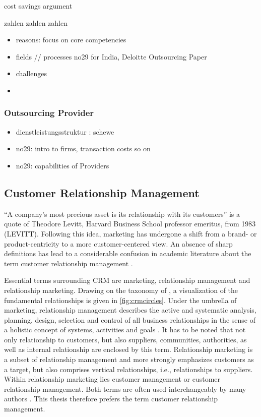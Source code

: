 		cost savings argument
		
		zahlen zahlen zahlen
		
		
		\begin{itemize}
			\item reasons: focus on core competencies
			\item fields // processes no29 for India, Deloitte Outsourcing Paper
			\item challenges
			\item 
		\end{itemize}
		\subsubsection{Outsourcing Provider}
		
		\begin{itemize}
			\item dienstleistungsstruktur  : schewe
			\item no29: intro to firms, transaction costs so on
			\item no29: capabilities of Providers
		\end{itemize}
		\subsection{Customer Relationship Management}
		\enquote{A company's most precious asset is its relationship with its customers} is a quote of Theodore Levitt, Harvard Business School professor emeritus, from 1983 (LEVITT). Following this idea, marketing has undergone a shift from a brand- or product-centricity to a more customer-centered view. An absence of sharp definitions has lead to a considerable confusion in academic literature about the term customer relationship management  \cite{paynefrow2005}. 
		
		Essential terms surrounding CRM are marketing, relationship management and relationship marketing. Drawing on the taxonomy of \cite{hippnerwilde2011}, a visualization of the fundamental relationships is given in \Fig \ref{fig:crmcircles}. Under the umbrella of marketing, relationship management describes the active and systematic analysis, planning, design, selection and control of all business relationships in the sense of a holistic concept of systems, activities and goals \citep[]{diller1995}. It has to be noted that not only relationship to customers, but also suppliers, communities, authorities, as well as internal relationship are enclosed by this term. Relationship marketing is a subset of relationship management and more strongly emphasizes customers as a target, but also comprises vertical relationships, i.e., relationships to suppliers. Within relationship marketing lies customer management or customer relationship management. Both terms are often used interchangeably by many authors \cite{Leuer2011,ryals2001customer}. This thesis therefore prefers the term customer relationship management. 
		
